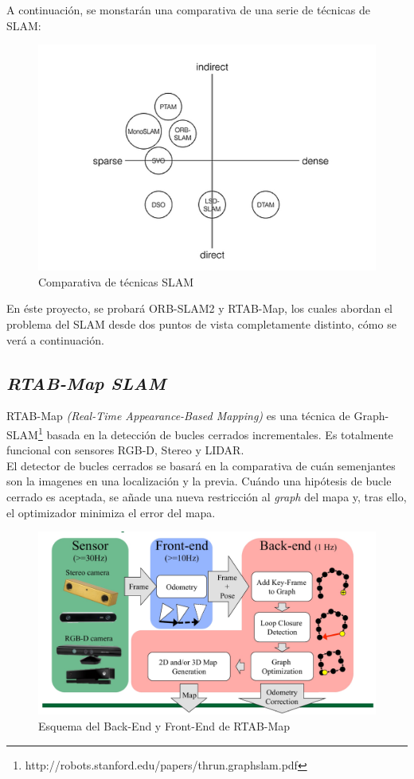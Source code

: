 \begin{itemize}
A continuación, se monstarán una comparativa de una serie de técnicas de SLAM:
\begin{figure}[h!]
    \centering
    \includegraphics[width=.6\textwidth]{images/comp_slam}
    \caption{Comparativa de técnicas SLAM}
\end{figure}

\end{itemize}
En éste proyecto, se probará ORB-SLAM2 y RTAB-Map, los cuales abordan el problema del SLAM desde dos puntos de vista completamente distinto, cómo se
verá a continuación.
\subsection{\textit{RTAB-Map SLAM}}
RTAB-Map \textit{(Real-Time Appearance-Based Mapping)} es una técnica de Graph-SLAM\footnote{http://robots.stanford.edu/papers/thrun.graphslam.pdf} basada en la detección de bucles cerrados incrementales. Es totalmente funcional 
con sensores RGB-D, Stereo y LIDAR. \\
El detector de bucles cerrados se basará en la comparativa de cuán semenjantes son la imagenes en una localización y la previa. Cuándo una hipótesis 
de bucle cerrado es aceptada, se añade una nueva restricción al \textit{graph} del mapa y, tras ello, el optimizador minimiza el error del mapa. \\

\begin{figure}[h!]
    \centering
    \includegraphics[width=.7\textwidth]{images/rtabmap_scheme}
    \caption{Esquema del Back-End y Front-End de RTAB-Map}
\end{figure}


